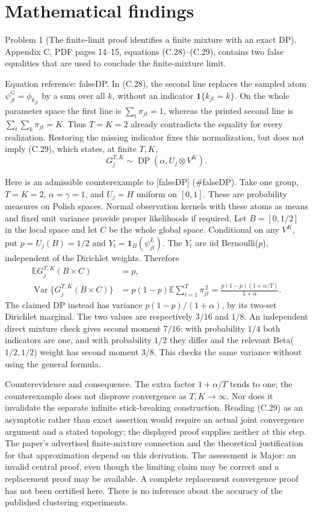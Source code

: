\documentclass[10pt]{article}
\begin{document}
\section*{Mathematical findings}
Problem 1 (The finite-limit proof identifies a finite mixture with an exact DP).  Appendix C, PDF pages 14–15, equations (C.28)–(C.29), contains two false equalities that are used to conclude the finite-mixture limit.\par
Equation reference: falseDP. In (C.28), the second line replaces the sampled atom \(\psi^G_{jt}=\phi_{k_{jt}}\) by a sum over all \(k\), without an indicator \(\mathbf1\{k_{jt}=k\}\). On the whole parameter space the first line is \(\sum_t\pi_{jt}=1\), whereas the printed second line is \(\sum_t\sum_k\pi_{jt}=K\). Thus \(T=K=2\) already contradicts the equality for every realization. Restoring the missing indicator fixes this normalization, but does not imply (C.29), which states, at finite \(T,K\), \[
 G_j^{T,K}\sim\operatorname{DP}(\alpha,U_j\otimes V^K).\]\par
Here is an admissible counterexample to [falseDP] (\#falseDP). Take one group, \(T=K=2\), \(\alpha=\gamma=1\), and \(U_j=H\) uniform on \([0,1]\). These are probability measures on Polish spaces. Normal observation kernels with these atoms as means and fixed unit variance provide proper likelihoods if required. Let \(B=[0,1/2]\) in the local space and let \(C\) be the whole global space. Conditional on any \(V^K\), put \(p=U_j(B)=1/2\) and \(Y_t=\mathbf1_B(\psi^L_{jt})\). The \(Y_t\) are iid Bernoulli(\(p\)), independent of the Dirichlet weights. Therefore \[\begin{aligned}
 \mathbb EG_j^{T,K}(B\times C)&=p,\\
 \operatorname{Var}\{G_j^{T,K}(B\times C)\}
 &=p(1-p)\mathbb E\sum_{t=1}^T\pi_{jt}^{\,2}
 =\frac{p(1-p)(1+\alpha/T)}{1+\alpha}.\end{aligned}\] The claimed DP instead has variance \(p(1-p)/(1+\alpha)\), by its two-set Dirichlet marginal. The two values are respectively \(3/16\) and \(1/8\). An independent direct mixture check gives second moment \(7/16\): with probability \(1/4\) both indicators are one, and with probability \(1/2\) they differ and the relevant Beta(\(1/2,1/2\)) weight has second moment \(3/8\). This checks the same variance without using the general formula.\par
Counterevidence and consequence. The extra factor \(1+\alpha/T\) tends to one; the counterexample does not disprove convergence as \(T,K\to\infty\). Nor does it invalidate the separate infinite stick-breaking construction. Reading (C.29) as an asymptotic rather than exact assertion would require an actual joint convergence argument and a stated topology; the displayed proof supplies neither at this step. The paper’s advertised finite-mixture connection and the theoretical justification for that approximation depend on this derivation. The assessment is Major: an invalid central proof, even though the limiting claim may be correct and a replacement proof may be available. A complete replacement convergence proof has not been certified here. There is no inference about the accuracy of the published clustering experiments.\par
\end{document}
